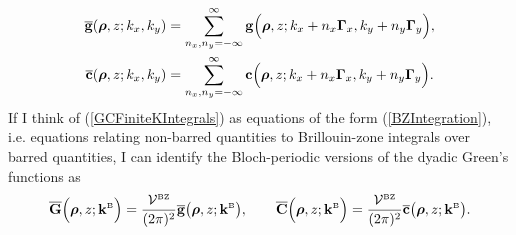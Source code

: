 \documentclass[letterpaper]{article}
\newcommand{\vbGamma}{\boldsymbol{\Gamma}}
\begin{document}
\begin{align*}
 \overline{\vb g}(\vbrho, z; k_x, k_y)
 &= \sum_{n_x, n_y=-\infty}^{\infty}
     \vb g\Big(\vbrho, z; k_x + n_x\vbGamma_x, k_y + n_y \vbGamma_y\Big), 
\\
 \overline{\vb c}(\vbrho, z; k_x, k_y) 
 &= \sum_{n_x, n_y=-\infty}^{\infty}
     \vb c\Big(\vbrho, z; k_x + n_x\vbGamma_x, k_y + n_y \vbGamma_y\Big).
\end{align*}
If I think of (\ref{GCFiniteKIntegrals}) as equations of the form
(\ref{BZIntegration}), i.e. equations relating non-barred quantities
to Brillouin-zone integrals over barred quantities, I can
identify the Bloch-periodic versions of the dyadic Green's functions
as 
$$
\overline{\mathbf{G}}\Big(\boldsymbol{\rho}, z; \mathbf{k}^{\hbox{\tiny{B}}}\Big)
=\frac{\mathcal{V}^{\hbox{\tiny{BZ}}}}{(2\pi)^2}
  \overline{\mathbf{g}}\big(\boldsymbol{\rho}, z; \mathbf{k}^{\hbox{\tiny{B}}}\big), 
\qquad
\overline{\mathbf{C}}\Big(\boldsymbol{\rho}, z; \mathbf{k}^{\hbox{\tiny{B}}}\Big)
=\frac{\mathcal{V}^{\hbox{\tiny{BZ}}}}{(2\pi)^2}
  \overline{\mathbf{c}}\big(\boldsymbol{\rho}, z; \mathbf{k}^{\hbox{\tiny{B}}}\big).
$$

\newpage
\newcommand{\EE}{\mathbb{E}}
\end{document}
